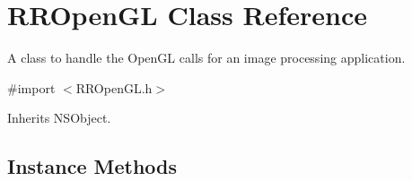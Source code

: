 \hypertarget{interface_r_r_open_g_l}{\section{R\-R\-Open\-G\-L Class Reference}
\label{interface_r_r_open_g_l}
}


A class to handle the Open\-G\-L calls for an image processing application.  




{\ttfamily \#import $<$R\-R\-Open\-G\-L.\-h$>$}



Inherits N\-S\-Object.

\subsection*{Instance Methods}
